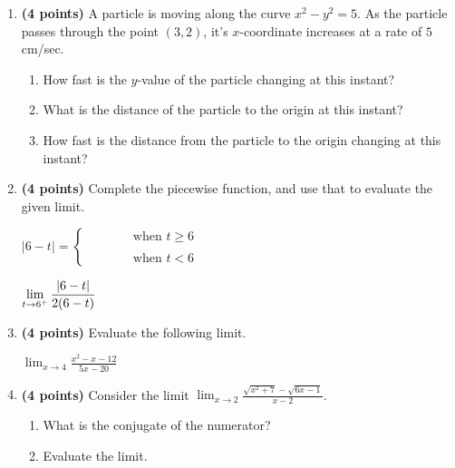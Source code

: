 \documentclass[12pt]{amsart}
\begin{document}
\begin{enumerate}
\vspace{2cm}
\newpage\def \b{1}\def \x{3}\def \y{2}\def \xchange{5}\def \ratrhs{6}\def \cirrhs{13}\def \hyprhs{5}\def \compy{y^{2}}\def \ychangenum{10}\def \dist{13}\def \fracrat{\frac{50}{3}}\def \fraccirc{0}\def \frachyp{60}
\item {\bf (4 points)} 
 A particle is moving along the curve $x^2 - \compy = \hyprhs$. As the particle passes through the point $(\x,\y)$, it's $x$-coordinate increases at a rate of $\xchange$cm/sec. \begin{enumerate}
\item How fast is the $y$-value of the particle changing at this instant? \vfill
\item What is the distance of the particle to the origin at this instant? \vfill
\item How fast is the distance from the particle to the origin changing at this instant? \vfill
\end{enumerate}

\newpage\def \a{6}\def \k{2}\def \abstop{1}\def \ktop{0}
\item {\bf (4 points)} 
 Complete the piecewise function, and use that to evaluate the given limit.

\vspace{.5cm}

$|\a - t| = \begin{cases} \hspace{1cm} & \text{ when } t \geq \a \\ & \\ \hspace{1cm} & \text{ when } t < \a \end{cases}$

\vspace{.5cm}

$\displaystyle \lim_{t \rightarrow \a^+} \frac{\ifthenelse{\ktop=1}{\k}{}\ifthenelse{\abstop=1}{|\a-t|}{(\a-t)}}{\ifthenelse{\ktop=0}{\k}{}\ifthenelse{\abstop=0}{|\a-t|}{(\a-t)}}$

\vfill 
\def \a{4}\def \b{-3}\def \k{5}\def \fancyp{x^{2}-x^{}-12}\def \simplep{5x^{}-20}\def \fancyreduced{7}\def \niceanstop{\frac{7}{5}}\def \niceansbottom{\frac{5}{7}}
\item {\bf (4 points)} 
 Evaluate the following limit. 

$\displaystyle \lim_{x\rightarrow \a} \frac{\fancyp}{\simplep}$

\vfill 
\newpage\def \a{2}\def \b{4}\def \ab{8}\def \c{7}\def \amb{-2}\def \ansroot{11}\def \firstroot{x^{2}+7}\def \secondroot{6x^{}-1}\def \porm{1}
\item {\bf (4 points)} 
 Consider the limit $\displaystyle \lim_{x \rightarrow \a} \frac{\sqrt{\firstroot} - \sqrt{\secondroot}}{x-\a}$. \begin{enumerate}
\item What is the conjugate of the numerator? \vspace{3cm}
\item Evaluate the limit.
\end{enumerate}


\end{enumerate}
\end{document}

